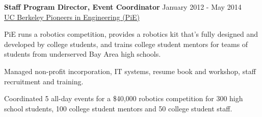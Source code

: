 \documentclass[margin,line,hyperref,color]{res}
\newenvironment{packed_itemize}{
\begin{itemize}[leftmargin=1.5em]
  \setlength{\itemsep}{0pt}
  \setlength{\parskip}{0pt}
  \setlength{\parsep}{0pt}
}{\end{itemize}}
\begin{document}
\begin{resume}
\textbf{Staff Program Director, Event Coordinator }  \hfill   January 2012 - May 2014\\
\href{https://pioneers.berkeley.edu/}{UC Berkeley Pioneers in Engineering (PiE)}
\begin{packed_itemize}
\item  PiE runs a robotics competition, provides a robotics kit that's fully designed and developed by college students, and trains  college student mentors for teams of students from underserved Bay Area high schools.
\item Managed non-profit incorporation, IT systems, resume book and workshop, staff recruitment and training.
\item Coordinated 5 all-day events for a \$40,000 robotics competition for  300  high school students, 100 college student mentors and 50 college student staff.
\end{packed_itemize}


\end{resume}
\end{document}
